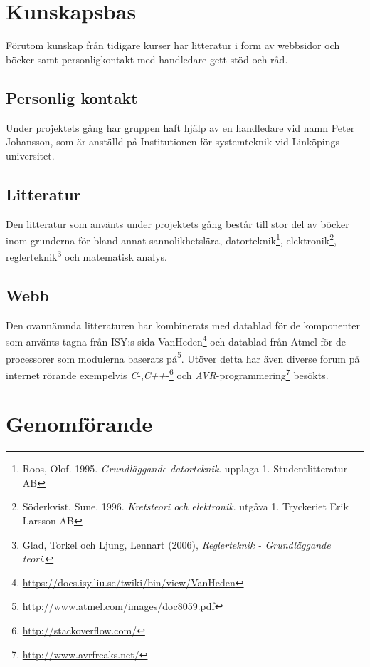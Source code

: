 \documentclass[a4paper,12pt,fleqn]{article}
\begin{document}
\section{Kunskapsbas}

Förutom kunskap från tidigare kurser har litteratur i form av webbsidor och böcker samt personligkontakt med handledare gett stöd och råd. 

\subsection{Personlig kontakt}
Under projektets gång har gruppen haft hjälp av en handledare vid namn Peter Johansson, som är anställd på Institutionen för systemteknik vid Linköpings universitet. 

\subsection{Litteratur}
Den litteratur som använts under projektets gång består till stor del av böcker inom grunderna för bland annat sannolikhetslära, datorteknik\footnote{Roos, Olof. 1995. \textit{Grundläggande datorteknik}. upplaga 1. Studentlitteratur AB}, elektronik\footnote{Söderkvist, Sune. 1996. \textit{Kretsteori och elektronik}. utgåva 1. Tryckeriet Erik Larsson AB}, reglerteknik\footnote{Glad, Torkel och Ljung, Lennart (2006), \textit{Reglerteknik - Grundläggande teori}.} och matematisk analys.

\subsection{Webb}
Den ovannämnda litteraturen har kombinerats med datablad för de komponenter som använts tagna från ISY:s sida VanHeden\footnote{\url{https://docs.isy.liu.se/twiki/bin/view/VanHeden}} och datablad från Atmel för de processorer som modulerna baserats på\footnote{\url{http://www.atmel.com/images/doc8059.pdf}}. 
Utöver detta har även diverse forum på internet rörande exempelvis \emph{C}-,\emph{C++}-\footnote{\url{http://stackoverflow.com/}} och \emph{AVR}-programmering\footnote{\url{http://www.avrfreaks.net/}} besökts.


\section{Genomförande}
\end{document}
